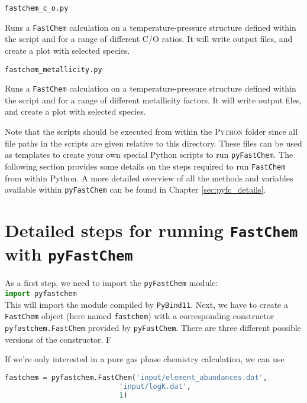 \documentclass[numbers=noenddot]{aux/fcmanual}
\newcommand{\fc}{\texttt{FastChem}\xspace}
\newcommand{\pfc}{\texttt{pyFastChem}\xspace}
\newcommand{\pb}{\texttt{PyBind11}\xspace}
\begin{document}
\lstinline!fastchem_c_o.py!
\begin{addmargin}[25pt]{0pt}
  Runs a \fc calculation on a temperature-pressure structure defined within the script and for a range of different C/O ratios. It will write output files, and create a plot with selected species.\\
\end{addmargin}

\lstinline!fastchem_metallicity.py!
\begin{addmargin}[25pt]{0pt}
  Runs a \fc calculation on a temperature-pressure structure defined within the script and for a range of different metallicity factors. It will write output files, and create a plot with selected species.\\
\end{addmargin}

Note that the scripts should be executed from within the \textsc{Python} folder since all file paths in the scripts are given relative to this directory.
These files can be used as templates to create your own special Python scripts to run \pfc. The following section provides some details on the steps required to run \fc from within Python. A more detailed overview of all the methods and variables available within \pfc can be found in Chapter \ref{sec:pyfc_details}.


\section{Detailed steps for running \fc with \pfc}

As a first step, we need to import the \pfc module:\\

\lstinline[language=Python]!import pyfastchem!\\

This will import the module compiled by \pb. Next, we have to create a \fc object (here named \lstinline[language=Python]!fastchem!) with a corresponding constructor \lstinline[language=Python]!pyfastchem.FastChem! provided by \pfc. There are three different possible versions of the constructor. F

If we're only interested in a pure gas phase chemistry calculation, we can use
\begin{lstlisting}[language=Python]
fastchem = pyfastchem.FastChem('input/element_abundances.dat', 
	                       'input/logK.dat', 
	                       1)
\end{lstlisting}
\end{document}
